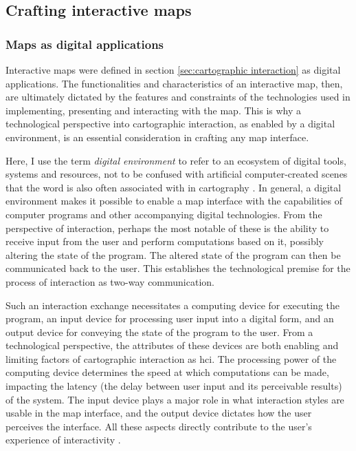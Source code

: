 \subsection{Crafting interactive maps}



\subsubsection{Maps as digital applications}
\label{sec:digital maps}

Interactive maps were defined in
section \ref{sec:cartographic interaction}
as digital applications.
The functionalities and characteristics of an interactive map, then,
are ultimately dictated by the features and constraints of the technologies
used in implementing, presenting and interacting with the map.
This is why a technological perspective into
cartographic interaction, as enabled by a digital environment,
is an essential consideration in crafting any map interface.

Here, I use the term \textit{digital environment} to refer to
an ecosystem of digital tools, systems and resources,
not to be confused with artificial computer-created scenes
that the word is also often associated with in cartography \parencite{kon2011}.
In general, a digital environment makes it possible to enable a map interface with
the capabilities of computer programs and other accompanying digital technologies.
From the perspective of interaction, perhaps the most notable of these
is the ability to receive input from the user and perform computations based on it,
possibly altering the state of the program.
The altered state of the program can then be communicated back to the user.
This establishes the technological premise for
the process of interaction as two-way communication.

Such an interaction exchange necessitates a computing device for executing the program,
an input device for processing user input into a digital form,
and an output device for conveying the state of the program to the user.
From a technological perspective,
the attributes of these devices are both enabling and limiting factors of
cartographic interaction as \acrshort{hci}.
The processing power of the computing device determines the speed at which
computations can be made, impacting the latency
(the delay between user input and its perceivable results)
of the system.
The input device plays a major role in what interaction styles
are usable in the map interface,
and the output device dictates how the user perceives the interface.
All these aspects directly contribute to the user's experience of interactivity
\parencite{mac2002, car1980}.

